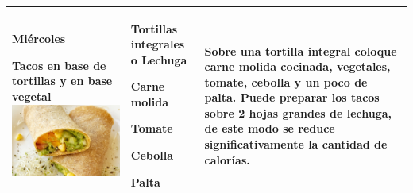 \documentclass[menu.tex]{subfiles}
\begin{document}
\begin{tabular} {p{3.5cm} p{4cm} p{9cm}}
        \pbox{20cm}
        {
            \rule{0pt}{3ex}\begin{large}\textbf{Miércoles}\end{large}\\
            \rule{0pt}{2ex}Tacos en base de \\ tortillas y en base \\ vegetal \\ \includegraphics[scale=0.17]{tacos-integrales}
        }&
        \vspace{-2cm}
        \begin{compactitem} 
            \begin{footnotesize}
                \item Tortillas integrales o Lechuga
                \item Carne molida
                \item Tomate
                \item Cebolla
                \item Palta
            \end{footnotesize}
        \end{compactitem}&
        \vspace{-2cm}
        Sobre una tortilla integral coloque carne molida cocinada, vegetales, tomate, cebolla y un poco de palta. Puede preparar los tacos sobre 2 hojas grandes de lechuga, de este modo se reduce significativamente la cantidad de calorías.\\
        \hline
        

\end{tabular}
\end{document}
